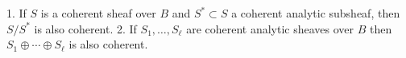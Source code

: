 1. If $S$ is a coherent sheaf over $B$ and $S^* \subset S$ a coherent analytic subsheaf, then $S/S^*$ is also coherent.
2. If $S_1, \ldots, S_\ell$ are coherent analytic sheaves over $B$ then $S_1 \oplus \cdots \oplus S_\ell$ is also coherent.
